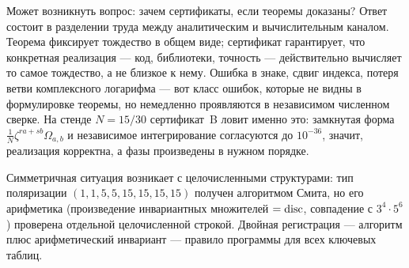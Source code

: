 Может возникнуть вопрос: зачем сертификаты, если теоремы доказаны?
Ответ состоит в разделении труда между аналитическим и вычислительным
каналом. Теорема фиксирует тождество в общем виде; сертификат
гарантирует, что конкретная реализация --- код, библиотеки, точность
--- действительно вычисляет то самое тождество, а не близкое к нему.
Ошибка в знаке, сдвиг индекса, потеря ветви комплексного логарифма ---
вот класс ошибок, которые не видны в формулировке теоремы, но
немедленно проявляются в независимом численном сверке. На стенде
$N=15/30$ сертификат~B ловит именно это: замкнутая форма
$\frac1N\zeta^{ra+sb}\Omega_{a,b}$ и независимое интегрирование
согласуются до $10^{-36}$, значит, реализация корректна, а фазы
произведены в нужном порядке.

Симметричная ситуация возникает с целочисленными структурами: тип
поляризации $(1,1,5,5,15,15,15,15)$ получен алгоритмом Смита, но
его арифметика (произведение инвариантных множителей $= \operatorname{disc}$,
совпадение с $3^4\cdot5^6$) проверена отдельной целочисленной
строкой. Двойная регистрация --- алгоритм плюс арифметический
инвариант --- правило программы для всех ключевых таблиц.

